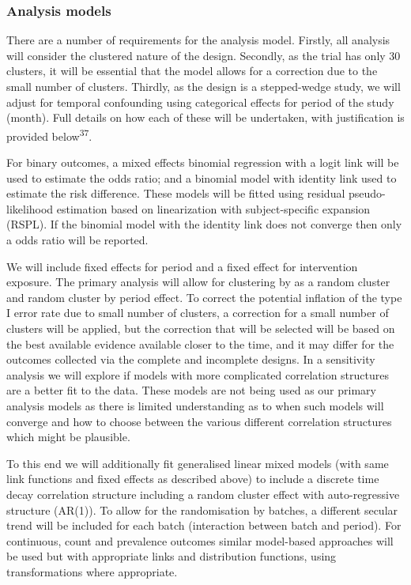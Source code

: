 \documentclass[
]{scrartcl}
\begin{document}
\hypertarget{analysis-models}{%
\subsubsection{Analysis models}\label{analysis-models}}

There are a number of requirements for the analysis model. Firstly, all
analysis will consider the clustered nature of the design. Secondly, as
the trial has only 30 clusters, it will be essential that the model
allows for a correction due to the small number of clusters. Thirdly, as
the design is a stepped-wedge study, we will adjust for temporal
confounding using categorical effects for period of the study (month).
Full details on how each of these will be undertaken, with justification
is provided below\textsuperscript{37}.

For binary outcomes, a mixed effects binomial regression with a logit
link will be used to estimate the odds ratio; and a binomial model with
identity link used to estimate the risk difference. These models will be
fitted using residual pseudo-likelihood estimation based on
linearization with subject-specific expansion (RSPL). If the binomial
model with the identity link does not converge then only a odds ratio
will be reported.

We will include fixed effects for period and a fixed effect for
intervention exposure. The primary analysis will allow for clustering by
as a random cluster and random cluster by period effect. To correct the
potential inflation of the type I error rate due to small number of
clusters, a correction for a small number of clusters will be applied,
but the correction that will be selected will be based on the best
available evidence available closer to the time, and it may differ for
the outcomes collected via the complete and incomplete designs. In a
sensitivity analysis we will explore if models with more complicated
correlation structures are a better fit to the data. These models are
not being used as our primary analysis models as there is limited
understanding as to when such models will converge and how to choose
between the various different correlation structures which might be
plausible.

To this end we will additionally fit generalised linear mixed models
(with same link functions and fixed effects as described above) to
include a discrete time decay correlation structure including a random
cluster effect with auto-regressive structure (AR(1)). To allow for the
randomisation by batches, a different secular trend will be included for
each batch (interaction between batch and period). For continuous, count
and prevalence outcomes similar model-based approaches will be used but
with appropriate links and distribution functions, using transformations
where appropriate.
\end{document}
